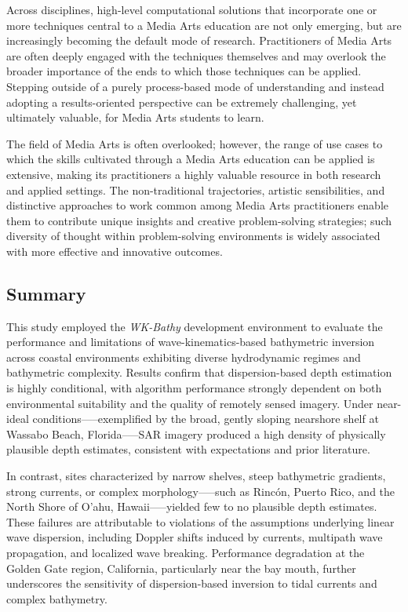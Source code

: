 \documentclass[12pt]{article}
\begin{document}
Across disciplines, high-level computational solutions that incorporate one or more techniques central to a Media Arts education are not only emerging, but are increasingly becoming the default mode of research. Practitioners of Media Arts are often deeply engaged with the techniques themselves and may overlook the broader importance of the ends to which those techniques can be applied. Stepping outside of a purely process-based mode of understanding and instead adopting a results-oriented perspective can be extremely challenging, yet ultimately valuable, for Media Arts students to learn.

The field of Media Arts is often overlooked; however, the range of use cases to which the skills cultivated through a Media Arts education can be applied is extensive, making its practitioners a highly valuable resource in both research and applied settings. The non-traditional trajectories, artistic sensibilities, and distinctive approaches to work common among Media Arts practitioners enable them to contribute unique insights and creative problem-solving strategies; such diversity of thought within problem-solving environments is widely associated with more effective and innovative outcomes.

\subsection{Summary}

This study employed the \textit{WK-Bathy} development environment to evaluate the performance and limitations of wave-kinematics-based bathymetric inversion across coastal environments exhibiting diverse hydrodynamic regimes and bathymetric complexity. Results confirm that dispersion-based depth estimation is highly conditional, with algorithm performance strongly dependent on both environmental suitability and the quality of remotely sensed imagery. Under near-ideal conditions—--exemplified by the broad, gently sloping nearshore shelf at Wassabo Beach, Florida--—SAR imagery produced a high density of physically plausible depth estimates, consistent with expectations and prior literature.

In contrast, sites characterized by narrow shelves, steep bathymetric gradients, strong currents, or complex morphology—--such as Rincón, Puerto Rico, and the North Shore of O'ahu, Hawaii--—yielded few to no plausible depth estimates. These failures are attributable to violations of the assumptions underlying linear wave dispersion, including Doppler shifts induced by currents, multipath wave propagation, and localized wave breaking. Performance degradation at the Golden Gate region, California, particularly near the bay mouth, further underscores the sensitivity of dispersion-based inversion to tidal currents and complex bathymetry.
\end{document}
